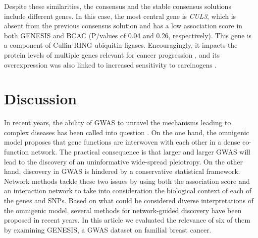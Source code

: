 \documentclass[10pt,letterpaper]{article}
\begin{document}
Despite these similarities, the consensus and the stable consensus solutions include different genes. In this case, the most central gene is \emph{CUL3}, which is absent from the previous consensus solution and has a low association score in both GENESIS and BCAC (P\=/values of 0.04 and 0.26, respectively). This gene is a component of Cullin-RING ubiquitin ligases. Encouragingly, it impacts the protein levels of multiple genes relevant for cancer progression \cite{Chen2016}, and its overexpression was also linked to increased sensitivity to carcinogens \cite{Loignon2009}.

\section{Discussion}

In recent years, the ability of GWAS to unravel the mechanisms leading to complex diseases has been called into question \cite{boyle_expanded_2017}. On the one hand, the omnigenic model proposes that gene functions are interwoven with each other in a dense co-function network. The practical consequence is that larger and larger GWAS will lead to the discovery of an uninformative wide-spread pleiotropy. On the other hand, discovery in GWAS is hindered by a conservative statistical framework. Network methods tackle these two issues by using both the association score and an interaction network to take into consideration the biological context of each of the genes and SNPs. Based on what could be considered diverse interpretations of the omnigenic model, several methods for network-guided discovery have been proposed in recent years. In this article we evaluated the relevance of six of them by examining GENESIS, a GWAS dataset on familial breast cancer.
\end{document}
